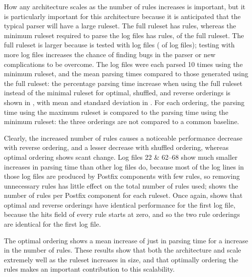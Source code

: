 How any architecture scales as the number of rules increases is important,
but it is particularly important for this architecture because it is
anticipated that the typical parser will have a large ruleset.  The full
\parsername{} ruleset has \numberOFrules{} rules, whereas the minimum
ruleset required to parse the \numberOFlogFILES{} log files has
\numberOFrulesMINIMUM{} rules, \numberOFrulesMINIMUMpercentage{} of the
full ruleset.  The full ruleset is larger because \parsername{} is tested
with \numberOFlogFILESall{} log files (\numberOFlogFILESallYEARS{} of log
files); testing with more log files increases the chance of finding bugs in
the parser or new complications to be overcome.  The \numberOFlogFILES{}
log files were each parsed 10 times using the minimum ruleset, and the mean
parsing times compared to those generated using the full ruleset: the
percentage parsing time increase when using the full ruleset instead of the
minimal ruleset for optimal, shuffled, and reverse orderings is shown in
, with mean and standard deviation in
.  For each ordering, the parsing time
using the maximum ruleset is compared to the parsing time using the minimum
ruleset: the three orderings are not compared to a common baseline.

Clearly, the increased number of rules causes a noticeable performance
decrease with reverse ordering, and a lesser decrease with shuffled
ordering, whereas optimal ordering shows scant change.  Log files 22 \&
62--68 show much smaller increases in parsing time than other log files do,
because most of the log lines in those log files are produced by Postfix
components with few rules, so removing unnecessary rules has little effect
on the total number of rules used;  shows the number of rules
per Postfix component for each ruleset.  Once again,  shows that optimal and reverse orderings have identical
performance for the first log file, because the hits field of every rule
starts at zero, and so the two rule orderings are identical for the first
log file.

The optimal ordering shows a mean increase of just
 in parsing time
for a \numberOFrulesMAXIMUMpercentage{} increase in the number of rules.
These results show that both the architecture and \parsername{} scale
extremely well as the ruleset increases in size, and that optimally
ordering the rules makes an important contribution to this scalability.

